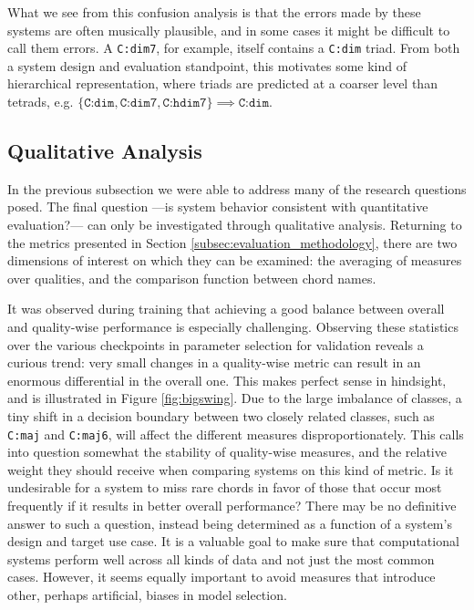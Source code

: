 What we see from this confusion analysis is that the errors made by these systems are often musically plausible, and in some cases it might be difficult to call them errors.
A \texttt{C:dim7}, for example, itself contains a \texttt{C:dim} triad.
From both a system design and evaluation standpoint, this motivates some kind of hierarchical representation, where triads are predicted at a coarser level than tetrads, e.g. $\{\texttt{C:dim}, \texttt{C:dim7}, \texttt{C:hdim7}\} \implies \texttt{C:dim}$.


\subsection{Qualitative Analysis}
\label{subsec:qualitative_analysis}

In the previous subsection we were able to address many of the research questions posed.
The final question ---is system behavior consistent with quantitative evaluation?--- can only be investigated through qualitative analysis.
Returning to the metrics presented in Section \ref{subsec:evaluation_methodology}, there are two dimensions of interest on which they can be examined: the averaging of measures over qualities, and the comparison function between chord names.

It was observed during training that achieving a good balance between overall and quality-wise performance is especially challenging.
Observing these statistics over the various checkpoints in parameter selection for validation reveals a curious trend: very small changes in a quality-wise metric can result in an enormous differential in the overall one.
This makes perfect sense in hindsight, and is illustrated in Figure \ref{fig:bigswing}.
Due to the large imbalance of classes, a tiny shift in a decision boundary between two closely related classes, such as \texttt{C:maj} and \texttt{C:maj6}, will affect the different measures disproportionately.
This calls into question somewhat the stability of quality-wise measures, and the relative weight they should receive when comparing systems on this kind of metric.
Is it undesirable for a system to miss rare chords in favor of those that occur most frequently if it results in better overall performance?
There may be no definitive answer to such a question, instead being determined as a function of a system's design and target use case.
It is a valuable goal to make sure that computational systems perform well across all kinds of data and not just the most common cases.
However, it seems equally important to avoid measures that introduce other, perhaps artificial, biases in model selection.

